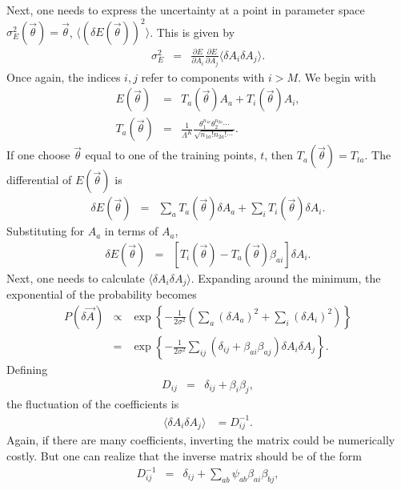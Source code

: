 \documentclass[UserManual.tex]{subfiles}
\begin{document}
Next, one needs to express the uncertainty at a point in parameter space $\sigma_E^2(\vec{\theta})=\vec{\theta}$, $\langle(\delta E(\vec{\theta}))^2\rangle$. This is given by 
\begin{eqnarray}
\sigma_E^2&=&\frac{\partial E}{\partial A_i}\frac{\partial E}{\partial A_j}\langle \delta A_i\delta A_j\rangle. 
\end{eqnarray}
Once again, the indices $i,j$ refer to components with $i>M$. We begin with 
\begin{eqnarray}
E(\vec{\theta})&=&T_a(\vec{\theta})A_a+T_i(\vec{\theta})A_i,\\
\nonumber
T_a(\vec{\theta})&=&\frac{1}{\Lambda^K}\frac{\theta_1^{n_{1a}}\theta_2^{n_{2a}}\cdots}{\sqrt{n_{1a}!n_{2a}!\cdots}}.
\end{eqnarray}
If one choose $\vec{\theta}$ equal to one of the training points, $t$, then $T_a(\vec{\theta})=T_{ta}$. The differential of $E(\vec{\theta})$ is
\begin{eqnarray}
\delta E(\vec{\theta})&=&\sum_aT_a(\vec{\theta})\delta A_a+\sum_iT_i(\vec{\theta})\delta A_i.
\end{eqnarray}
Substituting for $A_a$ in terms of $A_a$, 
\begin{eqnarray}
\delta E(\vec{\theta})&=&\left[T_i(\vec{\theta})-T_a(\vec{\theta})\beta_{ai}\right]\delta A_i.
\end{eqnarray}
Next, one needs to calculate $\langle\delta A_i\delta A_j\rangle$. Expanding around the minimum, the exponential of the probability becomes
\begin{eqnarray}
P(\delta\vec{A})&\propto&
\exp\left\{
-\frac{1}{2\sigma^2}\left(\sum_a(\delta A_a)^2+\sum_i(\delta A_i)^2\right)
\right\}\\
\nonumber
&=&\exp\left\{
-\frac{1}{2\sigma^2}\sum_{ij}\left(\delta_{ij}+\beta_{ai}\beta_{aj}\right)\delta A_i\delta A_j
\right\}.
\end{eqnarray}
Defining
\begin{eqnarray}
D_{ij}&=&\delta_{ij}+\beta_i\beta_j,
\end{eqnarray}
the fluctuation of the coefficients is
\begin{eqnarray}
\langle\delta A_i\delta A_j\rangle&=D^{-1}_{ij}.
\end{eqnarray}
Again, if there are many coefficients, inverting the matrix could be numerically costly. But one can realize that the inverse matrix should be of the form
\begin{eqnarray}\label{eq:DinvDef}
D^{-1}_{ij}&=&\delta_{ij}+\sum_{ab}\psi_{ab}\beta_{ai}\beta_{bj},
\end{eqnarray}
\end{document}
